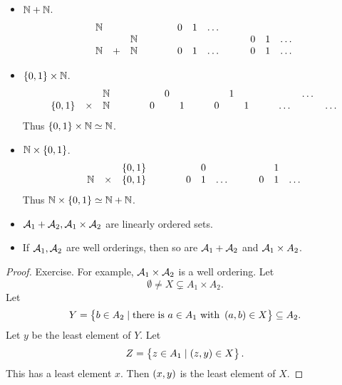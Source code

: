 \begin{example*}
\hfill
\begin{itemize}
\item $ \N + \N $.
$$
\begin{array}{ccccccccccc}
\N & & & \qquad & 0 & 1 & \dots & \quad & & & \\
& & \N & \qquad & & & & \quad & 0 & 1 & \dots \\
\N & + & \N & \qquad & 0 & 1 & \dots & \quad & 0 & 1 & \dots
\end{array}
$$
\item $ \cbr{0, 1} \times \N $.
$$
\begin{array}{ccccccccccccccc}
& & \N & \qquad & & 0 & & \quad & & 1 & & \quad & & \dots & \\
\cbr{0, 1} & \times & \N & \qquad & 0 & & 1 & \quad & 0 & & 1 & \quad & \dots & & \dots
\end{array}
$$
Thus $ \cbr{0, 1} \times \N \simeq \N $.
\item $ \N \times \cbr{0, 1} $.
$$
\begin{array}{ccccccccccc}
& & \cbr{0, 1} & \qquad & & 0 & & \quad & & 1 & \\
\N & \times & \cbr{0, 1} & \qquad & 0 & 1 & \dots & \quad & 0 & 1 & \dots
\end{array}
$$
Thus $ \N \times \cbr{0, 1} \simeq \N + \N $.
\end{itemize}
\end{example*}

\pagebreak

\begin{lemma}
\hfill
\begin{itemize}
\item $ \AA_1 + \AA_2, \AA_1 \times \AA_2 $ are linearly ordered sets.
\item If $ \AA_1, \AA_2 $ are well orderings, then so are $ \AA_1 + \AA_2 $ and $ \AA_1 \times A_2 $.
\end{itemize}
\end{lemma}

\begin{proof}
Exercise. For example, $ \AA_1 \times \AA_2 $ is a well ordering. Let
$$ \emptyset \ne X \subsetneq A_1 \times A_2. $$
Let
$$ Y = \cbr{b \in A_2 \mid \text{there is} \ a \in A_1 \ \text{with} \ \br{a, b} \in X} \subseteq A_2. $$
Let $ y $ be the least element of $ Y $. Let
$$ Z = \cbr{z \in A_1 \mid \br{z, y} \in X}. $$
This has a least element $ x $. Then $ \br{x, y} $ is the least element of $ X $.
\end{proof}

